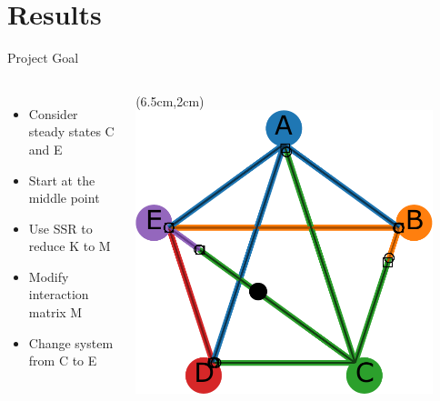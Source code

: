 \documentclass[15pt]{beamer}
\begin{document}
\section{Results}
\begin{frame}{Project Goal}
\begin{columns}
\begin{itemize}
	\item Consider steady states C and E
	\item Start at the middle point
	\item Use SSR to reduce K to M
	\item Modify interaction matrix M 
	\item Change system from C to E
\end{itemize}

	\begin{textblock*}{6cm}(6.5cm,2cm) %
	 \includegraphics[width=0.9\textwidth]{attractor_network_v3_w_dot}
	\end{textblock*}
\end{columns}
\end{frame}
\end{document}
